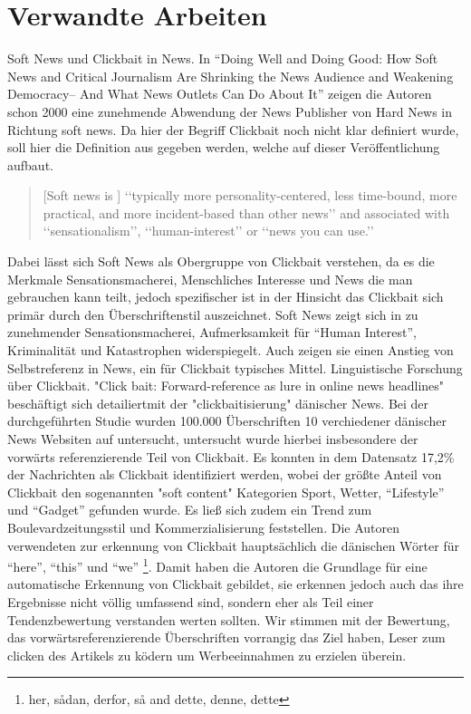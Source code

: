 \chapter{Verwandte Arbeiten} %
\label{cha:verwandte_arbeit}
Soft News und Clickbait in News.
In \enquote{Doing Well and Doing Good: How Soft News and Critical Journalism Are Shrinking
the News Audience and Weakening Democracy–
And What News Outlets Can Do About It} zeigen die Autoren schon 2000 eine zunehmende Abwendung der News Publisher von Hard News in Richtung soft news.
Da hier der Begriff Clickbait noch nicht klar definiert wurde, soll hier die Definition aus \cite{blom2015click} gegeben werden, welche auf dieser Veröffentlichung aufbaut.
\begin{quote}
[Soft news is ] ‘‘typically more personality-centered, less time-bound, more practical, and
more incident-based than other news’’ and associated with ‘‘sensationalism’’, ‘‘human-interest’’ or ‘‘news you can use.’’
\end{quote}
Dabei lässt sich Soft News als Obergruppe von Clickbait verstehen, da es die Merkmale Sensationsmacherei, Menschliches Interesse und News die man gebrauchen kann teilt, jedoch spezifischer ist in der Hinsicht das Clickbait sich primär durch den Überschriftenstil auszeichnet.
Soft News zeigt sich in zu zunehmender Sensationsmacherei, Aufmerksamkeit für  \enquote{Human Interest}, Kriminalität und Katastrophen widerspiegelt. Auch zeigen sie einen Anstieg von Selbstreferenz in News, ein für Clickbait typisches Mittel. 
Linguistische Forschung über Clickbait.
"Click bait: Forward-reference as lure in online news
headlines" \cite{blom2015click} beschäftigt sich detailiertmit der "clickbaitisierung" dänischer News. 
Bei der durchgeführten Studie wurden 100.000 Überschriften 10 verchiedener dänischer News Websiten auf untersucht, untersucht wurde hierbei insbesondere der vorwärts referenzierende Teil von Clickbait.
Es konnten in dem Datensatz 17,2\% der Nachrichten als Clickbait identifiziert werden, wobei der größte Anteil von Clickbait den  sogenannten "soft content" Kategorien Sport, Wetter, \enquote{Lifestyle} und \enquote{Gadget} gefunden wurde. Es ließ sich zudem ein Trend zum Boulevardzeitungsstil und Kommerzialisierung feststellen.
Die Autoren verwendeten zur erkennung von Clickbait hauptsächlich die dänischen Wörter für \enquote{here}, \enquote{this} und \enquote{we} \footnote{her, sådan, derfor, så and dette, denne, dette}.
Damit haben die Autoren die Grundlage für eine automatische Erkennung von Clickbait gebildet, sie erkennen jedoch auch das ihre Ergebnisse nicht völlig  umfassend sind, sondern eher als Teil einer Tendenzbewertung verstanden werten sollten.
Wir stimmen mit der Bewertung, das vorwärtsreferenzierende Überschriften vorrangig das Ziel haben, Leser zum clicken des Artikels zu ködern um Werbeeinnahmen zu erzielen überein.


